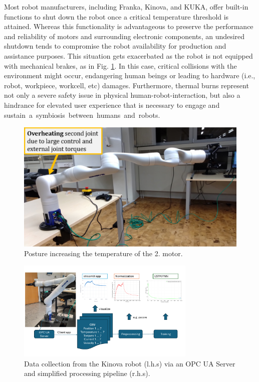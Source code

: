 \documentclass{ifacconf}
\begin{document}
Most robot manufacturers, including Franka, Kinova,  and KUKA, offer built-in functions to shut down the robot once a critical temperature threshold is attained. Whereas this functionality is advantageous to preserve the performance and reliability of motors and surrounding electronic components, an undesired shutdown tends to compromise the robot availability for production and assistance purposes. This situation gets exacerbated as the robot is not equipped with mechanical brakes, as in Fig. \ref{fig:intro}. In this case, critical collisions with the environment might occur, endangering human beings or leading to hardware (i.e., robot, workpiece, workcell, etc) damages. Furthermore, thermal burns represent  not only  a severe safety issue in physical human-robot-interaction, but also a hindrance for elevated user experience that is necessary to engage and \mbox{sustain a symbiosis between humans and robots.}
\begin{figure}[t]
	\centerline{\includegraphics[width=0.9\columnwidth]{pictures/intro_zoomed.png}}
	\caption{Posture increasing the temperature of the 2. motor.}
	\label{fig:intro}
\end{figure}
\begin{figure}[t!]
	\begin{center}
		\includegraphics[width=0.76\textwidth]{pictures/DataCollection.pdf} 
		\caption{Data collection from the Kinova robot (l.h.s) via an OPC UA Server and simplified processing pipeline (r.h.s).} 
		\label{fig:DataAquisition}
	\end{center}
\end{figure}
\end{document}
